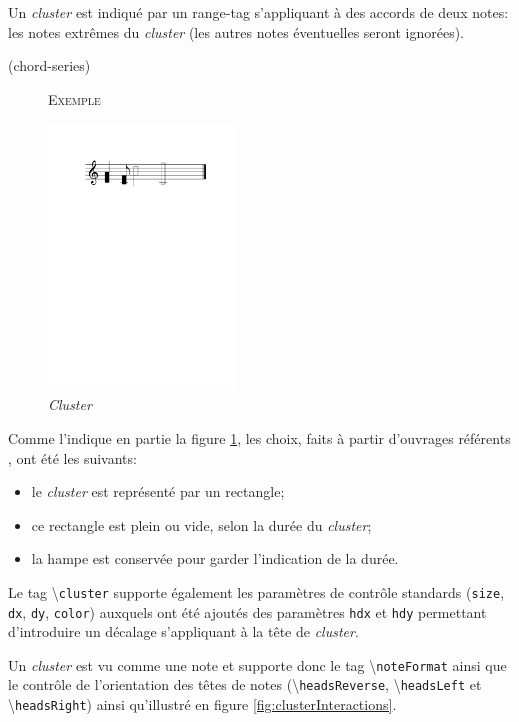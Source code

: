 \documentclass{article}
\newenvironment{gmncode}	{\vspace{-2mm}\small\verbatim}{\endverbatim\vspace{-2mm}}
\newcommand{\code}[1]		{{\small \texttt{#1}}}
\newcommand{\guidotag}[1]	{\textbackslash\code{#1}}
\newcommand{\exemple}		{\vspace{2mm}\hspace*{-3mm}\textsc{Exemple}}
\begin{document}
Un \emph{cluster} est indiqué par un range-tag s'appliquant à des accords de deux notes: les notes extrêmes du \emph{cluster} (les autres notes éventuelles seront ignorées).

\begin{gmncode}
(chord-series)
\end{gmncode}

\begin{figure}[h]
\exemple
\begin{gmncode}
[
  \cluster({a, d} {c/8, f}
      {a/2, d2} {c1/1, f2})
]
\end{gmncode}
\begin{center}
\includegraphics[width=50mm]{img/partitions/cluster.pdf}
\end{center}
\caption{\emph{Cluster}}
\label{fig:cluster}
\end{figure}
%

Comme l'indique en partie la figure \ref{fig:cluster}, les choix, faits à partir d'ouvrages référents \cite{gould2011behind,stone1980music}, ont été les suivants:
\begin{itemize}
	\item le \emph{cluster} est représenté par un rectangle;
	\item ce rectangle est plein ou vide, selon la durée du \emph{cluster};
	\item la hampe est conservée pour garder l'indication de la durée.
\end{itemize}

Le tag \guidotag{cluster} supporte également les paramètres de contrôle standards (\code{size}, \code{dx}, \code{dy}, \code{color}) auxquels ont été ajoutés des paramètres \code{hdx} et \code{hdy} permettant d'introduire un décalage s'appliquant à la tête de \emph{cluster}. 

Un \emph{cluster} est vu comme une note et supporte donc le tag \guidotag{noteFormat} ainsi que le contrôle de l'orientation des têtes de notes (\guidotag{headsReverse}, \guidotag{headsLeft} et \guidotag{headsRight}) ainsi qu'illustré en figure \ref{fig:clusterInteractions}.
\end{document}
